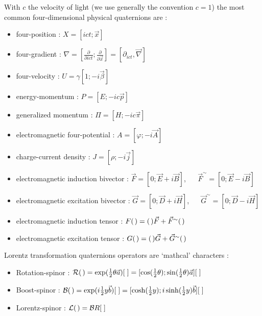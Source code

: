 \documentclass [12pt,a4paper      ]{article}
\newcommand{\Q}{[\hspace{1.mm}]} %
\newcommand{\A}{(\hspace{.5mm})} %
\newcommand{\REV}{\sim}               %
\newcommand{\DUA}{\widetilde}         %
\begin{document}
\noindent With $c$ the velocity of light (we use generally the convention $c=1$) the most common four-dimensional physical quaternions are :
\begin{itemize}
\item     four-position :     $X = [    ict;     \vec{x}  ]$
\item     four-gradient :     $\nabla= 
        [\frac{\partial}{\partial{ict}};\frac{\partial}{\partial\vec{x}}] =
        [\partial_{ict},\vec{\nabla}]$
\item     four-velocity :          $U = \gamma[1;-i\vec{\beta}] $
\item     energy-momentum :             $P = [ E; -i c \vec{p}]$
\item     generalized momentum :        $\Pi = [ H; -i c \vec{\pi}  ]$
\item     electromagnetic four-potential : $A = [\varphi ;    -i \vec{A}]$
\item     charge-current density :      $J = [ \rho ;    -i \vec{j}]$
\item electromagnetic induction bivector  : 
$\vec{F} = [0; \vec{E} +i \vec{B}]$, ~~ $\vec{F}^\REV = [0; \vec{E} -i \vec{B}]$
\item electromagnetic excitation bivector : 
$\vec{G} = [0; \vec{D} +i \vec{H}]$, ~~ $\vec{G}^\REV = [0; \vec{D} -i \vec{H}]$
\item  electromagnetic induction tensor  : $F\A = \A\vec{F} + \vec{F}^\REV\A$
\item  electromagnetic excitation tensor : $G\A = \A\vec{G} + \vec{G}^\REV\A$
\end{itemize}

 
\noindent Lorentz transformation quaternions operators are `mathcal' characters :
\begin{itemize}
\item Rotation-spinor : $\mathcal{R}\A = \exp(\frac{1}{2}\theta\vec{a})\Q  = [\cos(\frac{1}{2}\theta); \sin(\frac{1}{2}\theta)\vec{a}]\Q$
\item Boost-spinor   : $\mathcal{B}\A = \exp(i\frac{1}{2}y\vec{b})\Q = [\cosh(\frac{1}{2}y); i\sinh(\frac{1}{2}y)\vec{b}]\Q$
\item Lorentz-spinor : $\mathcal{L}\A  =  \mathcal{B}R\Q$
\end{itemize}
\end{document}
